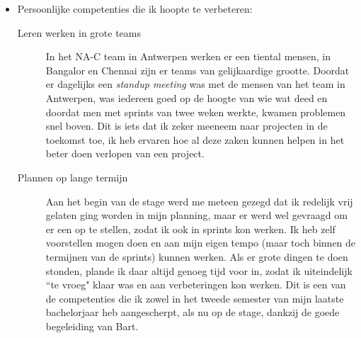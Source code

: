 \documentclass[10pt,a4paper]{article}
\begin{document}
\begin{itemize}
\begin{description}
\end{description}
\item Persoonlijke competenties die ik hoopte te verbeteren:
\begin{description}
\item[Leren werken in grote teams] In het NA-C team in Antwerpen werken er een tiental mensen, in Bangalor en Chennai zijn er teams van gelijkaardige grootte. Doordat er dagelijks een \textit{standup meeting} was met de mensen van het team in Antwerpen, was iedereen goed op de hoogte van wie wat deed en doordat men met sprints van twee weken werkte, kwamen problemen snel boven. Dit is iets dat ik zeker meeneem naar projecten in de toekomst toe, ik heb ervaren hoe al deze zaken kunnen helpen in het beter doen verlopen van een project.
\item[Plannen op lange termijn] Aan het begin van de stage werd me meteen gezegd dat ik redelijk vrij gelaten ging worden in mijn planning, maar er werd wel gevraagd om er een op te stellen, zodat ik ook in sprints kon werken. Ik heb zelf voorstellen mogen doen en aan mijn eigen tempo (maar toch binnen de termijnen van de sprints) kunnen werken. Als er grote dingen te doen stonden, plande ik daar altijd genoeg tijd voor in, zodat ik uiteindelijk ``te vroeg" klaar was en aan verbeteringen kon werken. Dit is een van de competenties die ik zowel in het tweede semester van mijn laatste bachelorjaar heb aangescherpt, als nu op de stage, dankzij de goede begeleiding van Bart.  
\end{description}
\end{itemize}
\end{document}
